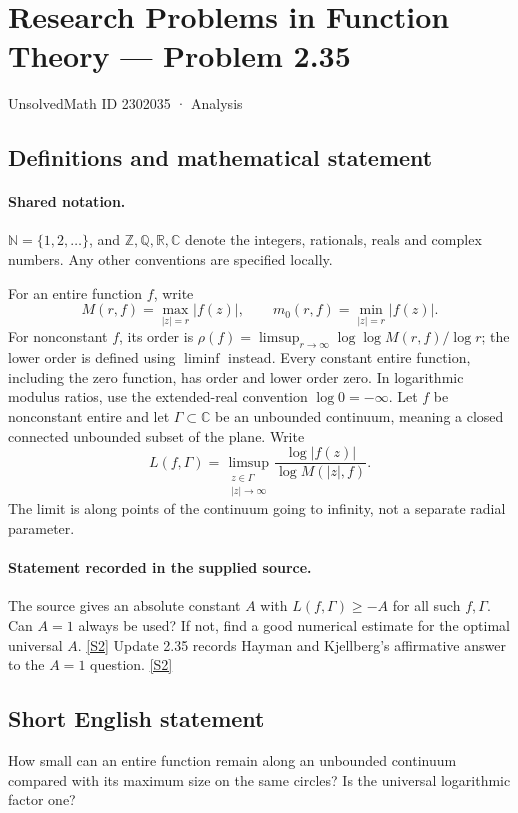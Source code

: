 \documentclass[11pt]{article}
\newcommand{\sref}[2]{\hyperlink{source:#1:#2}{[S#2]}}
\begin{document}
\setcounter{section}{2302034}
\section{Research Problems in Function Theory — Problem 2.35}\label{2302035}
{\small\sffamily UnsolvedMath ID 2302035 · Analysis}
\subsection{Definitions and mathematical statement}

\paragraph{Shared notation.}$\mathbb N=\{1,2,\ldots\}$, and $\mathbb Z,\mathbb Q,\mathbb R,\mathbb C$ denote the integers, rationals, reals and complex numbers. Any other conventions are specified locally.


For an entire function $f$, write
\[
 M(r,f)=\max_{|z|=r}|f(z)|,\qquad m_0(r,f)=\min_{|z|=r}|f(z)|.
\]
For nonconstant $f$, its order is $\rho(f)=\limsup_{r\to\infty}\log\log M(r,f)/\log r$;
the lower order is defined using $\liminf$ instead. Every constant entire function, including the zero function, has order and lower order zero. In logarithmic modulus ratios, use the extended-real convention $\log0=-\infty$.
Let $f$ be nonconstant entire and let $\Gamma\subset\mathbb C$ be an unbounded continuum, meaning a closed connected unbounded subset of the plane. Write
\[L(f,\Gamma)=\limsup_{\substack{z\in\Gamma\\|z|\to\infty}}
\frac{\log|f(z)|}{\log M(|z|,f)}.\]
The limit is along points of the continuum going to infinity, not a separate radial parameter.

\paragraph{Statement recorded in the supplied source.}
The source gives an absolute constant $A$ with $L(f,\Gamma)\ge -A$ for all such $f,\Gamma$. Can $A=1$ always be used? If not, find a good numerical estimate for the optimal universal $A$. \sref{2302035}{2}
Update 2.35 records Hayman and Kjellberg's affirmative answer to the $A=1$ question. \sref{2302035}{2}
\subsection{Short English statement}
How small can an entire function remain along an unbounded continuum compared with its maximum size on the same circles? Is the universal logarithmic factor one?
\end{document}
